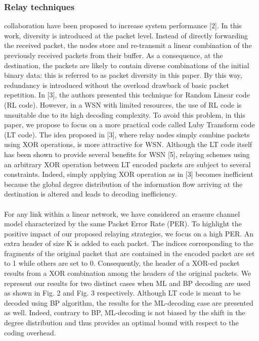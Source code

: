 \subsubsection{Relay techniques}
collaboration
have been proposed to increase system performance
[2]. In this work, diversity is introduced at the packet level.
Instead of directly forwarding the received packet, the nodes
store and re-transmit a linear combination of the previously
received packets from their buffer. As a consequence, at the
destination, the packets are likely to contain diverse combinations
of the initial binary data: this is referred to as packet
diversity in this paper. By this way, redundancy is introduced
without the overload drawback of basic packet repetition.
In [3], the authors presented this technique for Random
Linear code (RL code). However, in a WSN with limited
resources, the use of RL code is unsuitable due to its high
decoding complexity. To avoid this problem, in this paper,
we propose to focus on a more practical code called Luby
Transform code (LT code). The idea proposed in [3], where relay nodes simply combine
packets using XOR operations, is more attractive for WSN.
Although the LT code itself has been shown to provide
several benefits for WSN [5], relaying schemes using an
arbitrary XOR operation between LT encoded packets are
subject to several constraints. Indeed, simply applying XOR
operation as in [3] becomes inefficient because the global
degree distribution of the information flow arriving at the
destination is altered and leads to decoding inefficiency.\\
\\
For any link within a linear network, we have considered an
erasure channel model characterized by the same Packet Error Rate (PER). To highlight the positive impact of our proposed
relaying strategies, we focus on a high PER. An extra header
of size K is added to each packet. The indices corresponding
to the fragments of the original packet that are contained in
the encoded packet are set to 1 while others are set to 0.
Consequently, the header of a XOR-ed packet results from a
XOR combination among the headers of the original packets.
We represent our results for two distinct cases when ML
and BP decoding are used as shown in Fig. 2 and Fig.
3 respectively. Although LT code is meant to be decoded
using BP algorithm, the results for the ML-decoding case are
presented as well. Indeed, contrary to BP, ML-decoding is not
biased by the shift in the degree distribution and thus provides
an optimal bound with respect to the coding overhead.
